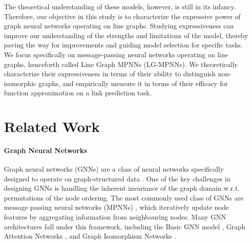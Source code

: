 \documentclass{article}
\newcommand{\wledge}{\texttt{wl-ed}}
\newcommand{\lwl}{\texttt{lwl}}
\begin{document}
The theoretical understanding of these models, however, is still in its infancy.
Therefore, our objective in this study is to characterize the expressive power of graph neural networks operating on line graphs. Studying expressiveness can improve our understanding of the strengths and limitations of the model, thereby paving the way for improvements and guiding model selection for specific tasks. We focus specifically on message-passing neural networks operating on line graphs, henceforth called Line Graph MPNNs (LG-MPNNs). We theoretically characterize their expressiveness in terms of their ability to distinguish non-isomorphic graphs, and empirically measure it in terms of their efficacy for function approximation on a link prediction task.



\section{Related Work}

\paragraph{Graph Neural Networks}
Graph neural networks (GNNs) are a class of neural networks specifically designed to operate on graph-structured data \cite{scarselli2008graph}. One of the key challenges in designing GNNs is handling the inherent invariance of the graph domain w.r.t. permutations of the node ordering.
The most commonly used class of GNNs are message passing neural networks (MPNNs) \cite{gilmer2017neural}, which iteratively update node features by aggregating information from neighbouring nodes. Many GNN architectures fall under this framework, including the Basic GNN model \cite{hamilton2020graph}, Graph Attention Networks \cite{velickovic2017graph}, and Graph Isomorphism Networks \cite{xu2018powerful}.
\end{document}
